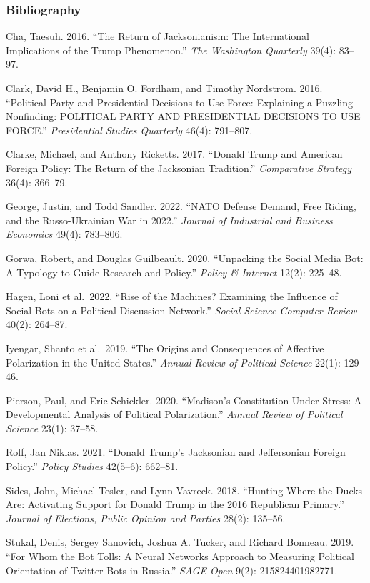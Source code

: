 \documentclass[
]{article}
\begin{document}
\hypertarget{bibliography}{%
\subsubsection{Bibliography}\label{bibliography}}

Cha, Taesuh. 2016. ``The Return of Jacksonianism: The International
Implications of the Trump Phenomenon.'' \emph{The Washington Quarterly}
39(4): 83--97.

Clark, David H., Benjamin O. Fordham, and Timothy Nordstrom. 2016.
``Political Party and Presidential Decisions to Use Force: Explaining a
Puzzling Nonfinding: POLITICAL PARTY AND PRESIDENTIAL DECISIONS TO USE
FORCE.'' \emph{Presidential Studies Quarterly} 46(4): 791--807.

Clarke, Michael, and Anthony Ricketts. 2017. ``Donald Trump and American
Foreign Policy: The Return of the Jacksonian Tradition.''
\emph{Comparative Strategy} 36(4): 366--79.

George, Justin, and Todd Sandler. 2022. ``NATO Defense Demand, Free
Riding, and the Russo-Ukrainian War in 2022.'' \emph{Journal of
Industrial and Business Economics} 49(4): 783--806.

Gorwa, Robert, and Douglas Guilbeault. 2020. ``Unpacking the Social
Media Bot: A Typology to Guide Research and Policy.'' \emph{Policy \&
Internet} 12(2): 225--48.

Hagen, Loni et al.~2022. ``Rise of the Machines? Examining the Influence
of Social Bots on a Political Discussion Network.'' \emph{Social Science
Computer Review} 40(2): 264--87.

Iyengar, Shanto et al.~2019. ``The Origins and Consequences of Affective
Polarization in the United States.'' \emph{Annual Review of Political
Science} 22(1): 129--46.

Pierson, Paul, and Eric Schickler. 2020. ``Madison's Constitution Under
Stress: A Developmental Analysis of Political Polarization.''
\emph{Annual Review of Political Science} 23(1): 37--58.

Rolf, Jan Niklas. 2021. ``Donald Trump's Jacksonian and Jeffersonian
Foreign Policy.'' \emph{Policy Studies} 42(5--6): 662--81.

Sides, John, Michael Tesler, and Lynn Vavreck. 2018. ``Hunting Where the
Ducks Are: Activating Support for Donald Trump in the 2016 Republican
Primary.'' \emph{Journal of Elections, Public Opinion and Parties}
28(2): 135--56.

Stukal, Denis, Sergey Sanovich, Joshua A. Tucker, and Richard Bonneau.
2019. ``For Whom the Bot Tolls: A Neural Networks Approach to Measuring
Political Orientation of Twitter Bots in Russia.'' \emph{SAGE Open}
9(2): 215824401982771.
\end{document}
